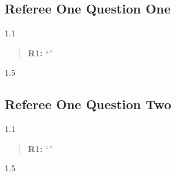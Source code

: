 \documentclass[12pt,english]{article}
\newcommand{\rrquote}{1.1}
\newcommand{\rrxspc}{1.5}
\begin{document}
\begin{refsection}
\subsection{Referee One Question One}
\begin{spacing}{\rrquote}
\begin{quotation}
\textbf{R1: }\enquote{\blindtext}
\end{quotation}
\end{spacing}

\begin{spacing}{\rrxspc}
\Blindtext
\end{spacing}

\subsection{Referee One Question Two}
\begin{spacing}{\rrquote}
\begin{quotation}
\textbf{R1: }\enquote{\blindtext}
\end{quotation}
\end{spacing}

\begin{spacing}{\rrxspc}
\Blindtext
\end{spacing}

\pagebreak
\begingroup
{}
\setlength\bibitemsep{0pt}
\printbibliography[heading=subbibliography]
\endgroup
\pagebreak
\end{refsection}
\end{document}
